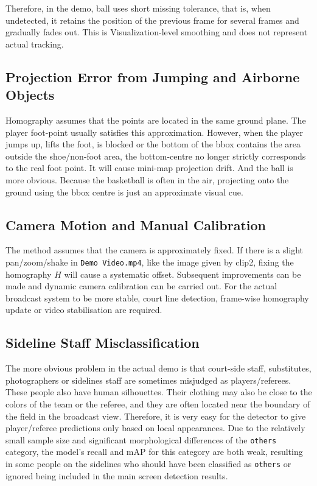\documentclass[12pt,a4paper]{article}
\begin{document}
Therefore, in the demo, ball uses short missing tolerance, that is, when undetected, it retains the position of the previous frame for several frames and gradually fades out. This is Visualization-level smoothing and does not represent actual tracking.

\subsection{Projection Error from Jumping and Airborne Objects}

Homography assumes that the points are located in the same ground plane. The player foot-point usually satisfies this approximation. However, when the player jumps up, lifts the foot, is blocked or the bottom of the bbox contains the area outside the shoe/non-foot area, the bottom-centre no longer strictly corresponds to the real foot point. It will cause mini-map projection drift. And the ball is more obvious. Because the basketball is often in the air, projecting onto the ground using the bbox centre is just an approximate visual cue.

\subsection{Camera Motion and Manual Calibration}

The method assumes that the camera is approximately fixed. If there is a slight pan/zoom/shake in \texttt{Demo Video.mp4}, like the image given by clip2, fixing the homography $H$ will cause a systematic offset. Subsequent improvements can be made and dynamic camera calibration can be carried out. For the actual broadcast system to be more stable, court line detection, frame-wise homography update or video stabilisation are required.

\subsection{Sideline Staff Misclassification}

The more obvious problem in the actual demo is that court-side staff, substitutes, photographers or sidelines staff are sometimes misjudged as players/referees. These people also have human silhouettes. Their clothing may also be close to the colors of the team or the referee, and they are often located near the boundary of the field in the broadcast view. Therefore, it is very easy for the detector to give player/referee predictions only based on local appearances. Due to the relatively small sample size and significant morphological differences of the \texttt{others} category, the model's recall and mAP for this category are both weak, resulting in some people on the sidelines who should have been classified as \texttt{others} or ignored being included in the main screen detection results.
\end{document}
